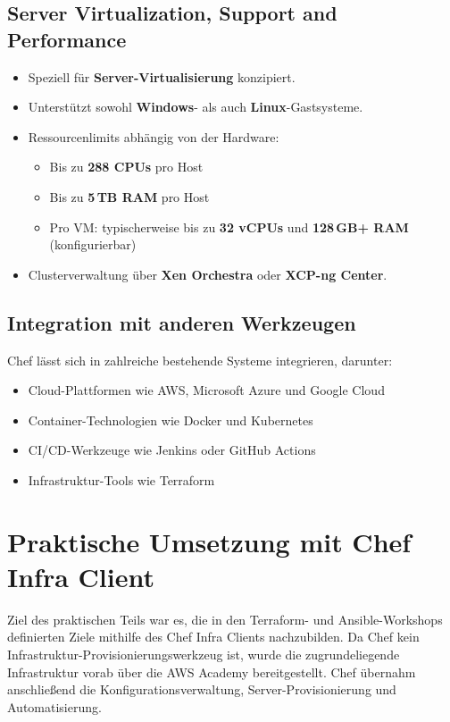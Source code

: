 \documentclass[BMR,Seminar,ngerman,IEEE]{twbook}
\begin{document}
\section{Server Virtualization, Support and Performance}
\begin{itemize}[noitemsep]
  \item Speziell für \textbf{Server-Virtualisierung} konzipiert.
  \item Unterstützt sowohl \textbf{Windows}- als auch \textbf{Linux}-Gastsysteme.
  \item Ressourcenlimits abhängig von der Hardware:
  \begin{itemize}
    \item Bis zu \textbf{288 CPUs} pro Host
    \item Bis zu \textbf{5\,TB RAM} pro Host
    \item Pro VM: typischerweise bis zu \textbf{32 vCPUs} und \textbf{128\,GB+ RAM} (konfigurierbar)
  \end{itemize}
  \item Clusterverwaltung über \textbf{Xen Orchestra} oder \textbf{XCP-ng Center}.
\end{itemize}

\section{Integration mit anderen Werkzeugen}
Chef lässt sich in zahlreiche bestehende Systeme integrieren, darunter:
\begin{itemize}
  \item Cloud-Plattformen wie AWS, Microsoft Azure und Google Cloud
  \item Container-Technologien wie Docker und Kubernetes
  \item CI/CD-Werkzeuge wie Jenkins oder GitHub Actions
  \item Infrastruktur-Tools wie Terraform
\end{itemize}

\chapter{Praktische Umsetzung mit Chef Infra Client}

Ziel des praktischen Teils war es, die in den Terraform- und Ansible-Workshops definierten Ziele
mithilfe des Chef Infra Clients nachzubilden.
Da Chef kein Infrastruktur-Provisionierungswerkzeug ist, wurde die zugrundeliegende Infrastruktur
vorab über die AWS Academy bereitgestellt.
Chef übernahm anschließend die Konfigurationsverwaltung, Server-Provisionierung und Automatisierung.
\end{document}
